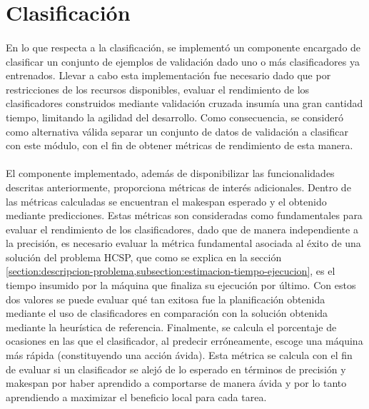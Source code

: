 \newpage %

\section{Clasificación} \label{chapter-implementacion:clasificacion}

\paragraph{} En lo que respecta a la clasificación, se implementó un componente encargado de clasificar un conjunto de ejemplos de validación dado uno o más clasificadores ya entrenados.
Llevar a cabo esta implementación fue necesario dado que por restricciones de los recursos disponibles, evaluar el rendimiento de los clasificadores construidos mediante validación cruzada insumía una gran cantidad tiempo, limitando la agilidad del desarrollo.
Como consecuencia, se consideró como alternativa válida separar un conjunto de datos de validación a clasificar con este módulo, con el fin de obtener métricas de rendimiento de esta manera. 

\paragraph{} El componente implementado, además de disponibilizar las funcionalidades descritas anteriormente, proporciona métricas de interés adicionales.
Dentro de las métricas calculadas se encuentran el makespan esperado y el obtenido mediante predicciones.
Estas métricas son consideradas como fundamentales para evaluar el rendimiento de los clasificadores, dado que de manera independiente a la precisión, es necesario evaluar la métrica fundamental asociada al éxito de una solución del problema HCSP, que como se explica en la sección \ref{section:descripcion-problema,subsection:estimacion-tiempo-ejecucion}, es el tiempo insumido por la máquina que finaliza su ejecución por último.
Con estos dos valores se puede evaluar qué tan exitosa fue la planificación obtenida mediante el uso de clasificadores en comparación con la solución obtenida mediante la heurística de referencia.
Finalmente, se calcula el porcentaje de ocasiones en las que el clasificador, al predecir erróneamente, escoge una máquina más rápida (constituyendo una acción ávida).
Esta métrica se calcula con el fin de evaluar si un clasificador se alejó de lo esperado en términos de precisión y makespan por haber aprendido a comportarse de manera ávida y por lo tanto aprendiendo a maximizar el beneficio local para cada tarea.

